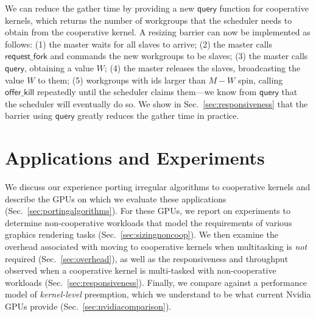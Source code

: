 \documentclass[sigconf]{acmart}
\newcommand{\mysec}{Sec.~}
\newcommand{\nvidia}{Nvidia\xspace}
\newcommand{\offerfork}{\mathsf{request\_fork}}
\newcommand{\offerkill}{\mathsf{offer\_kill}}
\newcommand{\keyword}[1]{\mathsf{#1}}
\begin{document}
{We can reduce the gather time by providing a new
$\keyword{query}$ function for cooperative kernels, which returns the
number of workgroups that the scheduler needs to obtain from the
cooperative kernel.
%
%
A resizing barrier can now be implemented as follows: (1) the master
waits for all slaves to arrive; (2) the master calls $\offerfork$ and
commands the new workgroups to be slaves; (3) the master calls
$\keyword{query}$, obtaining a value $W$; (4) the master releases the
slaves, broadcasting the value $W$ to them; (5) workgroups with ids
larger than $M-W$ spin, calling $\offerkill$ repeatedly until the
scheduler claims them---we know from $\keyword{query}$ that the
scheduler will eventually do so.
We show in
\mysec\ref{sec:responsiveness} that the barrier using $\keyword{query}$ greatly
reduces the gather time in practice.


\section{Applications and Experiments}\label{sec:experiments}

We discuss our experience porting irregular algorithms to cooperative
kernels and describe the GPUs on which we evaluate these applications
(\mysec\ref{sec:portingalgorithms}).  For these GPUs, we report on
experiments to determine non-cooperative workloads that model the
requirements of various graphics rendering tasks
(\mysec\ref{sec:sizingnoncoop}).  We then examine the overhead
associated with moving to cooperative kernels when multitasking is
\emph{not} required (\mysec\ref{sec:overhead}), as well as the
responsiveness and throughput observed when a cooperative kernel is
multi-tasked with non-cooperative workloads
(\mysec\ref{sec:responsiveness}). Finally, we compare
against a performance model of \emph{kernel-level} preemption, which
we understand to be what current Nvidia GPUs provide (\mysec\ref{sec:nvidiacomparison}).



}
\end{document}
